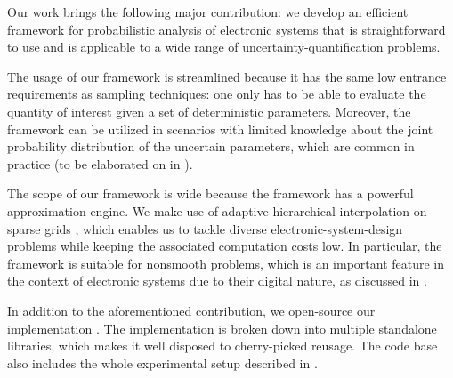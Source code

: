 Our work brings the following major contribution: we develop an efficient
framework for probabilistic analysis of electronic systems that is
straightforward to use and is applicable to a wide range of
uncertainty-quantification problems.

The usage of our framework is streamlined because it has the same low entrance
requirements as sampling techniques: one only has to be able to evaluate the
quantity of interest given a set of deterministic parameters. Moreover, the
framework can be utilized in scenarios with limited knowledge about the joint
probability distribution of the uncertain parameters, which are common in
practice (to be elaborated on in ).

The scope of our framework is wide because the framework has a powerful
approximation engine. We make use of adaptive hierarchical interpolation on
sparse grids \cite{jakeman2012, klimke2006, ma2009}, which enables us to tackle
diverse electronic-system-design problems while keeping the associated
computation costs low. In particular, the framework is suitable for nonsmooth
problems, which is an important feature in the context of electronic systems due
to their digital nature, as discussed in .

In addition to the aforementioned contribution, we open-source our
implementation \cite{sources}. The implementation is broken down into multiple
standalone libraries, which makes it well disposed to cherry-picked reusage. The
code base also includes the whole experimental setup described in
.
